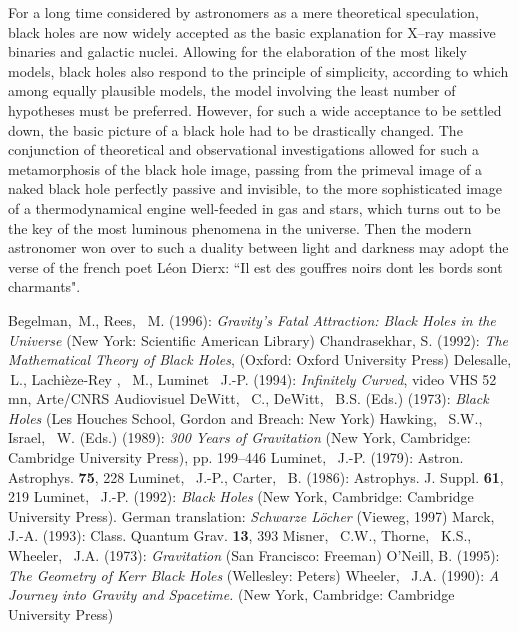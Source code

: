 \documentclass[12pt]{article}
\begin{document}
For a long time considered by astronomers as a mere theoretical speculation,
black holes are now
widely accepted as the basic explanation for X--ray massive binaries and galactic nuclei.
Allowing for the elaboration of the most likely models, black holes also respond to the
principle of simplicity, according to which among equally plausible 
models, the model involving the least number of hypotheses must be preferred. 
However, for such a wide acceptance to be settled down, the basic picture of a black hole
had to be drastically changed. The conjunction of theoretical and 
observational investigations
allowed for such a metamorphosis of the black hole image, passing from the primeval image of 
a naked black hole perfectly
passive and invisible, to the more sophisticated image of a thermodynamical engine well-feeded 
in gas and stars, which turns out to be the key of the most
luminous phenomena in the universe.
Then the modern astronomer won over to such a duality
between light and darkness may adopt the verse of the french poet L\'eon
Dierx: ``Il est des gouffres noirs dont les bords sont charmants".
 
%
%
\begin{thebibliography}{22}
%
%
 Begelman, \,M., Rees, \, M. (1996): {\it Gravity's Fatal Attraction: Black Holes 
in the Universe} 
(New York: Scientific American Library)
%
 Chandrasekhar, S. (1992): {\it The Mathematical Theory of Black 
Holes}, (Oxford: Oxford University Press)
%
 Delesalle, \,L., Lachi\`eze-Rey , \, M., Luminet \, 
J.-P. (1994): {\it Infinitely Curved}, video VHS 52 mn, Arte/CNRS Audiovisuel
%
 DeWitt, \, C., DeWitt, \, B.S. (Eds.) (1973): {\it Black Holes} (Les Houches 
School, Gordon and Breach: New York)
%
 Hawking, \, S.W., Israel, \, W. (Eds.) (1989): {\it 300 Years 
of Gravitation} 
(New York, Cambridge: Cambridge University Press), pp. 199--446
%
 Luminet, \, J.-P. (1979): Astron. Astrophys. {\bf 
75}, 228
%
 Luminet, \, J.-P., Carter, \, B. (1986): Astrophys. J. Suppl. 
{\bf 61}, 219
%
 Luminet, \, J.-P. (1992): {\it Black Holes} 
(New York, Cambridge: Cambridge University Press). German 
translation: {\it Schwarze L\"ocher} (Vieweg, 1997)
%
 Marck, \, J.-A. (1993): Class. Quantum Grav. {\bf 13}, 
393
%
 Misner, \, C.W., Thorne, \, K.S., Wheeler, \, J.A. (1973): 
{\it Gravitation} 
(San Francisco: Freeman)
%
 O'Neill, B. (1995): {\it The Geometry of Kerr Black Holes} 
(Wellesley: Peters)
%
 Wheeler, \, J.A. (1990): {\it A Journey into Gravity and 
Spacetime.} 
(New York, Cambridge: Cambridge University Press)
\end{thebibliography}
\end{document}
